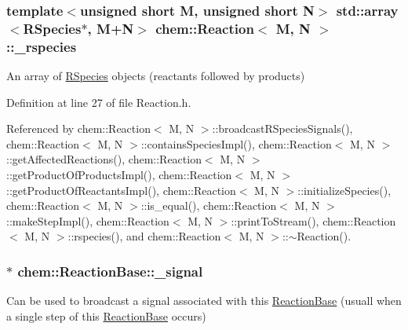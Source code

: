\hypertarget{classchem_1_1Reaction_a42e73865e61bfb5b03a4639b571e5d72}{
\subsubsection[{\-\_\-rspecies}]{\setlength{\rightskip}{0pt plus 5cm}template$<$unsigned short M, unsigned short N$>$ std\-::array$<${\bf R\-Species}$\ast$, M+N$>$ {\bf chem\-::\-Reaction}$<$ M, N $>$\-::{\bf \-\_\-rspecies}}}\label{classchem_1_1Reaction_a42e73865e61bfb5b03a4639b571e5d72}


An array of \hyperlink{classchem_1_1RSpecies}{R\-Species} objects (reactants followed by products) 



Definition at line 27 of file Reaction.\-h.



Referenced by chem\-::\-Reaction$<$ M, N $>$\-::broadcast\-R\-Species\-Signals(), chem\-::\-Reaction$<$ M, N $>$\-::contains\-Species\-Impl(), chem\-::\-Reaction$<$ M, N $>$\-::get\-Affected\-Reactions(), chem\-::\-Reaction$<$ M, N $>$\-::get\-Product\-Of\-Products\-Impl(), chem\-::\-Reaction$<$ M, N $>$\-::get\-Product\-Of\-Reactants\-Impl(), chem\-::\-Reaction$<$ M, N $>$\-::initialize\-Species(), chem\-::\-Reaction$<$ M, N $>$\-::is\-\_\-equal(), chem\-::\-Reaction$<$ M, N $>$\-::make\-Step\-Impl(), chem\-::\-Reaction$<$ M, N $>$\-::print\-To\-Stream(), chem\-::\-Reaction$<$ M, N $>$\-::rspecies(), and chem\-::\-Reaction$<$ M, N $>$\-::$\sim$\-Reaction().

\hypertarget{classchem_1_1ReactionBase_adad4289e6bbe5550c0d75a506bdc88ab}{
\subsubsection[{\-\_\-signal}]{$\ast$ {\bf chem\-::\-Reaction\-Base\-::\-\_\-signal}}}\label{classchem_1_1ReactionBase_adad4289e6bbe5550c0d75a506bdc88ab}


Can be used to broadcast a signal associated with this \hyperlink{classchem_1_1ReactionBase}{Reaction\-Base} (usuall when a single step of this \hyperlink{classchem_1_1ReactionBase}{Reaction\-Base} occurs) 



